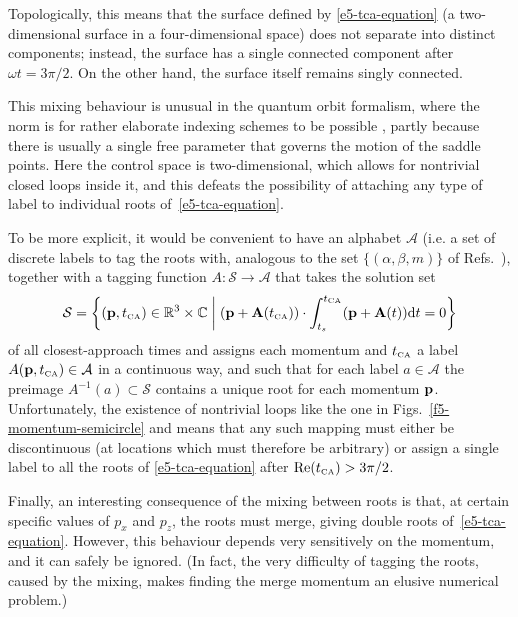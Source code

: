 Topologically, this means that the surface defined by \eqref{e5-tca-equation} (a two-dimensional surface in a four-dimensional space) does not separate into distinct components; instead, the surface has a single connected component after $\omega t=3\pi/2$. On the other hand, the surface itself remains singly connected. 
%


This mixing behaviour is unusual in the quantum orbit formalism, where the norm is for rather elaborate indexing schemes to be possible \cite{Becker_rescattering, milosevic_ISFA-standard_2007}, partly because there is usually a single free parameter that governs the motion of the saddle points. Here the control space is two-dimensional, which allows for nontrivial closed loops inside it, and this defeats the possibility of attaching any type of label to individual roots of~\eqref{e5-tca-equation}. 


To be more explicit, it would be convenient to have an alphabet $\mathcal A$ (i.e. a set of discrete labels to tag the roots with, analogous to the set $\{(\alpha,\beta, m)\}$ of Refs.~\citealp{Becker_rescattering, milosevic_ISFA-standard_2007}), together with a tagging function $A\colon \mathcal S \to \mathcal A$ that takes the solution set
\begin{equation}
\mathcal S = \left\{ (\vb{p},{t_{\scriptscriptstyle\mathrm{CA}}})\in\mathbb{R}^3\times\mathbb{C}  
\mathrel{}\middle|\mathrel{}
(\vb{p}+\vb{A}({t_{\scriptscriptstyle\mathrm{CA}}}))\cdot\int_{{t_s}}^{{t_{\scriptscriptstyle\mathrm{CA}}}} (\vb{p}+\vb{A}(t))\mathrm{d} t=0 
\right\}
\end{equation}
of all closest-approach times and assigns each momentum and ${t_{\scriptscriptstyle\mathrm{CA}}}$ a label $A(\vb{p},{t_{\scriptscriptstyle\mathrm{CA}}}) \in \mathcal A$ in a continuous way, and such that for each label $a\in\mathcal A$ the preimage $A^{-1}(a)\subset \mathcal S$ contains a unique root for each momentum $\vb{p}$. Unfortunately, the existence of nontrivial loops like the one in 
Figs.~\ref{f5-momentum-semicircle} and  means that any such mapping must either be discontinuous (at locations which must therefore be arbitrary) or assign a single label to all the roots of \eqref{e5-tca-equation} after $\Re({t_{\scriptscriptstyle\mathrm{CA}}})>3\pi/2$. 


Finally, an interesting consequence of the mixing between roots is that, at certain specific values of $p_x$ and $p_z$, the roots must merge, giving double roots of~\eqref{e5-tca-equation}. However, this behaviour depends very sensitively on the momentum, and it can safely be ignored. (In fact, the very difficulty of tagging the roots, caused by the mixing, makes finding the merge momentum an elusive numerical problem.)


